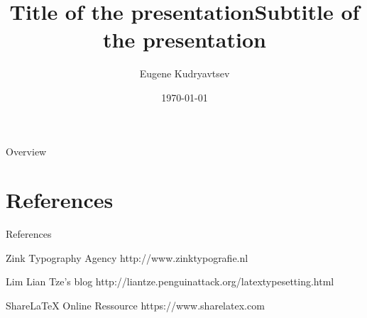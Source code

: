\documentclass{beamer}
\title{Title of the presentation}
\title{Subtitle of the presentation}
\author[Eugene]{Eugene Kudryavtsev}
\date{\today}
\institute[BFH]{Berner Fachhochschule}
\begin{document}
\begin{frame}
  \titlepage
\end{frame}

\begin{frame}[noframenumbering]{Overview}
  \tableofcontents
\end{frame}


\section*{References}
\begin{frame}{References}
	\begin{thebibliography}{10}
    \beamertemplateonlinebibitems
    Zink Typography Agency
		\newblock http://www.zinktypografie.nl

    \beamertemplateonlinebibitems
    Lim Lian Tze's blog
		\newblock http://liantze.penguinattack.org/latextypesetting.html

    \beamertemplateonlinebibitems
    Share{\rmfamily\LaTeX{}} Online Ressource
		\newblock https://www.sharelatex.com
    \end{thebibliography}
\end{frame}
\end{document}
